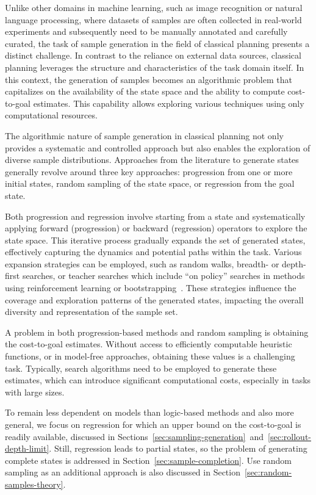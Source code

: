 Unlike other domains in machine learning, such as image recognition or natural language processing, where datasets of samples are often collected in real-world experiments and subsequently need to be manually annotated and carefully curated, the task of sample generation in the field of classical planning presents a distinct challenge. In contrast to the reliance on external data sources, classical planning leverages the structure and characteristics of the task domain itself. In this context, the generation of samples becomes an algorithmic problem that capitalizes on the availability of the state space and the ability to compute cost-to-goal estimates. This capability allows exploring various techniques using only computational resources.

The algorithmic nature of sample generation in classical planning not only provides a systematic and controlled approach but also enables the exploration of diverse sample distributions. Approaches from the literature to generate states generally revolve around three key approaches: progression from one or more initial states, random sampling of the state space, or regression from the goal state.

Both progression and regression involve starting from a state and systematically applying forward (progression) or backward (regression) operators to explore the state space. This iterative process gradually expands the set of generated states, effectively capturing the dynamics and potential paths within the task. Various expansion strategies can be employed, such as random walks, breadth- or depth-first searches, or teacher searches which include ``on policy'' searches in methods using reinforcement learning or bootstrapping~\cite{Arfaee.etal/2011}. These strategies influence the coverage and exploration patterns of the generated states, impacting the overall diversity and representation of the sample set.

A problem in both progression-based methods and random sampling is obtaining the cost-to-goal estimates. Without access to efficiently computable heuristic functions, or in model-free approaches, obtaining these values is a challenging task. Typically, search algorithms need to be employed to generate these estimates, which can introduce significant computational costs, especially in tasks with large sizes.

To remain less dependent on models than logic-based methods and also more general, we focus on regression for which an upper bound on the cost-to-goal is readily available, discussed in Sections~\ref{sec:sampling-generation}~and~\ref{sec:rollout-depth-limit}. Still, regression leads to partial states, so the problem of generating complete states is addressed in Section~\ref{sec:sample-completion}. Use random sampling as an additional approach is also discussed in Section~\ref{sec:random-samples-theory}.

